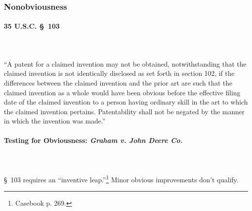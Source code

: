 
\subsubsection{Nonobviousness}

\paragraph{35 U.S.C. \S\ 103}
~\\\\
``A patent for a claimed invention may not be obtained, notwithstanding that the 
claimed invention is not identically disclosed as set forth in section 102, if 
the differences between the claimed invention and the prior art are such that 
the claimed invention as a whole would have been obvious before the effective 
filing date of the claimed invention to a person having ordinary skill in the 
art to which the claimed invention pertains. Patentability shall not be negated 
by the manner in which the invention was made.''

\paragraph{Testing for Obviousness: \emph{Graham v. John Deere Co.}}
~\\\\
\S\ 103 requires an ``inventive leap.''\footnote{Casebook p. 269.} Minor obvious 
improvements don't qualify.

